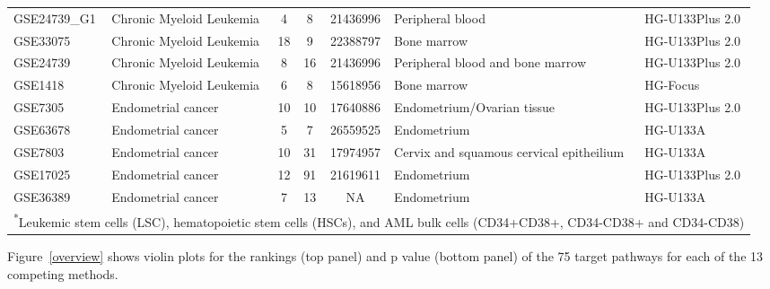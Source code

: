 \begin{landscape}
\begin{longtable}{lp{4cm}cccp{4cm}l}
GSE24739\_G1	&Chronic Myeloid Leukemia	&4	&8	&21436996	&Peripheral blood	&HG-U133Plus 2.0 \\
GSE33075	&Chronic Myeloid Leukemia	&18	&9	&22388797	&Bone marrow	&HG-U133Plus 2.0 \\
GSE24739	&Chronic Myeloid Leukemia	&8	&16	&21436996	&Peripheral blood and bone marrow	&HG-U133Plus 2.0\\
GSE1418	&Chronic Myeloid Leukemia	&6	&8	&15618956	&Bone marrow	&HG-Focus\\
GSE7305	&Endometrial cancer	&10	&10	&17640886	&Endometrium/Ovarian tissue	&HG-U133Plus 2.0\\
GSE63678	&Endometrial cancer	&5	&7	&26559525	&Endometrium	&HG-U133A\\
GSE7803	&Endometrial cancer	&10	&31	&17974957	&Cervix and squamous cervical epitheilium	&HG-U133A\\
GSE17025	&Endometrial cancer	&12	&91	&21619611	&Endometrium	&HG-U133Plus 2.0\\
GSE36389	&Endometrial cancer	&7	&13	&NA	&Endometrium	&HG-U133A\\
\hline
\multicolumn{7}{l}{\textsuperscript{*}\footnotesize{Leukemic stem cells (LSC), hematopoietic stem cells (HSCs), and AML bulk cells (CD34+CD38+, CD34-CD38+ and CD34-CD38)}}
\label{table:HumanDatasets}
\end{longtable}
\end{landscape}


Figure~\ref{overview} shows violin plots for the rankings (top panel) and p value (bottom panel) of the 75 target pathways for each of the 13 competing methods. 

